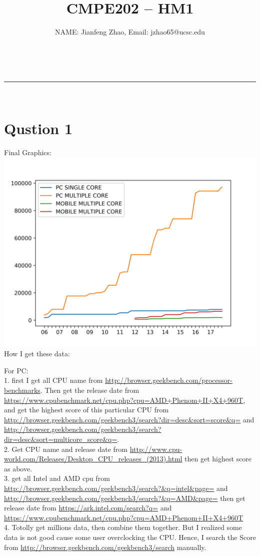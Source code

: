 \documentclass[a4paper,11pt,fleqn]{article}
\makeatletter
\newcommand{\linia}{\rule{\linewidth}{0.5pt}}
\theoremstyle{mytheor}
\renewcommand{\maketitle}{
\begin{center}
\vspace{2ex}
{\huge \textsc{\@title}}
\vspace{1ex}
\\
\linia\\
\@author \hfill \@date
\vspace{4ex}
\end{center}
}
\makeatother
\begin{document}
\title{CMPE202 -- HM1}

\author{NAME: Jianfeng Zhao, Email: jzhao65@ucsc.edu}

\maketitle



\section*{Qustion 1}


Final Graphics:\\
\includegraphics{plot}
\\
How I get these data:

For PC:\\
1. first I get all CPU name from \url{http://browser.geekbench.com/processor-benchmarks}. Then get the release date from \url{https://www.cpubenchmark.net/cpu.php?cpu=AMD+Phenom+II+X4+960T}, and get the highest score of this particular CPU from \url{http://browser.geekbench.com/geekbench3/search?dir=desc&sort=score&q=} and \url{http://browser.geekbench.com/geekbench3/search?dir=desc&sort=multicore_score&q=}.\\
2. Get CPU name and release date from \url{http://www.cpu-world.com/Releases/Desktop_CPU_releases_(2013).html} then get highest score as above.\\
3. get all Intel and AMD cpu from \url{http://browser.geekbench.com/geekbench3/search?&q=intel&page=} and \url{http://browser.geekbench.com/geekbench3/search?&q=AMD&page=} then get release date from \url{https://ark.intel.com/search?q=} and \url{https://www.cpubenchmark.net/cpu.php?cpu=AMD+Phenom+II+X4+960T}\\
4. Totolly get millions data, then combine them together. But I realized some data is not good cause some user overclocking the CPU. Hence, I search the Score from \url{http://browser.geekbench.com/geekbench3/search} manually. \\
\end{document}
